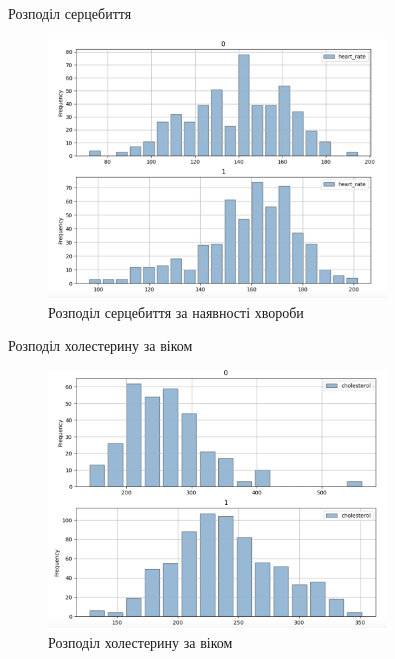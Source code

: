 \documentclass{beamer}
\begin{document}
    \begin{frame}{Розподіл серцебиття}
        \begin{figure}
            \centering
            \includegraphics[width=0.8\textwidth]{images/heart_rate.png}
            \caption{Розподіл серцебиття за наявності хвороби}
        \end{figure}
    \end{frame}

    \begin{frame}{Розподіл холестерину за віком}
        \begin{figure}
            \centering
            \includegraphics[width=0.8\textwidth]{images/cholesterol_age.png}
            \caption{Розподіл холестерину за віком}
        \end{figure}
    \end{frame}
\end{document}
